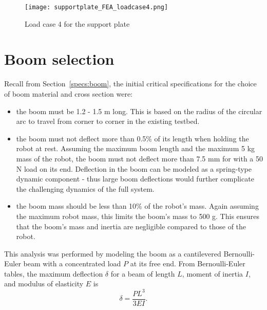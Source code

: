 \documentclass{report}
\begin{document}
\begin{figure}[H]
\centering
\texttt{[image: supportplate\_FEA\_loadcase4.png]}
\caption[Load case 4 for the support plate]{Load case 4 for the support plate}
\label{fig:supportplate_FEA_loadcase1}
\end{figure}

\section[Boom selection]{Boom selection}
Recall from Section~\ref{specs:boom}, the initial critical specifications for the choice of boom material and cross section were:
\begin{itemize}
	\item the boom must be 1.2 - 1.5 m long. This is based on the radius of the circular arc to travel from corner to corner in the existing testbed.
	\item the boom must not deflect more than 0.5\% of its length when holding the robot at rest. Assuming the maximum boom length and the maximum 5 kg mass of the robot, the boom must not deflect more than 7.5 mm for with a 50 N load on its end. Deflection in the boom can be modeled as a spring-type dynamic component - thus large boom deflections would further complicate the challenging dynamics of the full system.
	\item the boom mass should be less than 10\% of the robot's mass. Again assuming the maximum robot mass, this limits the boom's mass to 500 g. This ensures that the boom's mass and inertia are negligible compared to those of the robot.
\end{itemize}

This analysis was performed by modeling the boom as a cantilevered Bernoulli-Euler beam with a concentrated load $P$ at its free end. From Bernoulli-Euler tables, the maximum deflection $\delta$ for a beam of length $L$, moment of inertia $I$, and modulus of elasticity $E$ is
\begin{equation}
\delta = \frac{PL^3}{3EI}\text{.}
\end{equation}
\end{document}
